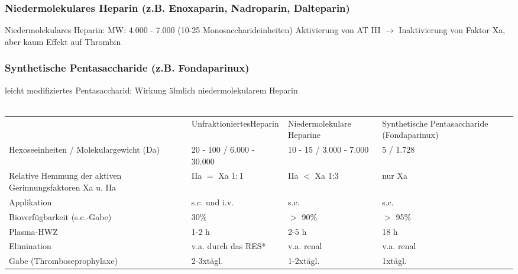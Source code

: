 \documentclass[10pt,a4paper]{report}
\begin{document}
\subsubsection{Niedermolekulares Heparin (z.B. Enoxaparin, Nadroparin, Dalteparin)} %
\label{par:niedermolekulares_heparin_z_b_enoxaparin_nadroparin_dalteparin_}
Niedermolekulares Heparin: MW: 4.000 - 7.000 (10-25 Monosaccharideinheiten) Aktivierung von AT III  $\rightarrow$ Inaktivierung von Faktor Xa, aber kaum Effekt auf Thrombin
\subsubsection{Synthetische Pentasaccharide (z.B. Fondaparinux)} %
\label{par:synthetische_pentasaccharide_z_b_fondaparinux_}
leicht modifiziertes Pentasaccharid; Wirkung ähnlich niedermolekularem Heparin \\ \\
\begin{tabularx}{\textwidth}{XXXX}
&UnfraktioniertesHeparin&Niedermolekulare Heparine&Synthetische Pentasaccharide (Fondaparinux)\\
Hexoseeinheiten / Molekulargewicht (Da)&20 - 100 / 6.000 - 30.000&10 - 15 / 3.000 - 7.000&5 / 1.728 \\
Relative Hemmung der aktiven Gerinnungsfaktoren Xa u. IIa&IIa $=$ Xa 1$:$1&IIa $<$ Xa 1:3&nur Xa \\
Applikation&s.c. und i.v.&s.c.&s.c.\\
Bioverfügbarkeit (s.c.-Gabe)&30\%&$>$ 90\%&$>$ 95\%\\
Plasma-HWZ&1-2 h&2-5 h&18 h\\
Elimination&v.a. durch das RES*&v.a. renal&v.a. renal\\
Gabe (Thromboseprophylaxe)&2-3xtägl.&1-2xtägl.&1xtägl.\\
\end{tabularx}
\end{document}
